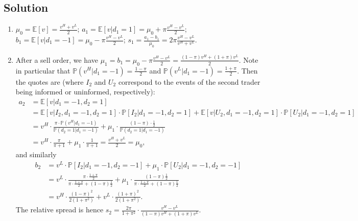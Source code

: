 \documentclass[a4paper]{article}
\newif\ifsolutions
\begin{document}
\ifsolutions
\subsection*{Solution}

\begin{enumerate}
	\item $\mu_0 = \mathbb{E}[v] = \frac{v^H+v^L}{2}$; $a_1 = \mathbb{E}[v|d_1=1] = \mu_0 + \pi \frac{v^H-v^L}{2}$; $b_1 = \mathbb{E}[v|d_1=-1] = \mu_0 - \pi \frac{v^H-v^L}{2}$; $s_1 = \frac{a_1-b_1}{\mu_0} = 2\pi \frac{v^H - v^L}{v^H+v^L}$.
	
	\item After a sell order, we have $\mu_1 = b_1 = \mu_0 - \pi \frac{v^H-v^L}{2} = \frac{(1-\pi)v^H + (1+\pi)v^L}{2}$. Note in particular that $\mathbb{P}(v^H|d_1=-1) = \frac{1-\pi}{2}$ and $\mathbb{P}(v^L|d_1=-1) = \frac{1+\pi}{2}$. 
	Then the quotes are (where $I_2$ and $U_2$ correspond to the events of the second trader being informed or uninformed, respectively):
	\begin{align*}
		a_2 &= \mathbb{E}[v|d_1=-1,d_2=1] 
		\\
		&= \mathbb{E}[v|I_2,d_1=-1,d_2=1] \cdot \mathbb{P}[I_2|d_1=-1,d_2=1] + \mathbb{E}[v|U_2,d_1=-1,d_2=1] \cdot \mathbb{P}[U_2|d_1=-1,d_2=1]
		\\
		&= v^H \cdot \frac{\pi \cdot \mathbb{P}(v^H|d_1=-1)}{\mathbb{P}(d_2=1|d_1=-1)} + \mu_1 \cdot \frac{(1-\pi) \cdot \frac{1}{2}}{\mathbb{P}(d_2=1|d_1=-1)}
		\\
		&= v^H \cdot \frac{\pi}{\pi+1} + \mu_1 \cdot \frac{1}{\pi+1} = \frac{v^H+v^L}{2} = \mu_0,
	\end{align*}
	and similarly
	\begin{align*}
		b_2 &= v^L \cdot \mathbb{P}[I_2|d_1=-1,d_2=-1] + \mu_1 \cdot \mathbb{P}[U_2|d_1=-1,d_2=-1]
		\\
		&= v^L \cdot \frac{\pi \cdot \frac{1+\pi}{2}}{\pi \cdot \frac{1+\pi}{2} + (1-\pi)\frac{1}{2}} + \mu_1 \cdot \frac{(1-\pi)\frac{1}{2}}{\pi \cdot \frac{1+\pi}{2} + (1-\pi)\frac{1}{2}}
		\\
		&= v^H \cdot \frac{(1-\pi)^2}{2(1+\pi^2)} + v^L \cdot \frac{(1+\pi)^2}{2(1+\pi^2)}.
	\end{align*}
	The relative spread is hence $s_2 = \frac{2\pi}{1+\pi^2} \cdot \frac{v^H-v^L}{(1-\pi)v^H + (1+\pi)v^L}$.
	

\end{enumerate}
\end{document}
